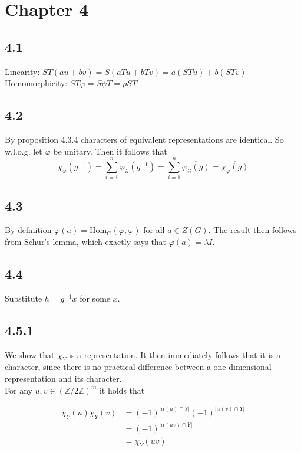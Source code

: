 \documentclass[12pt]{article}
\begin{document}
\section*{Chapter 4}

\subsection*{4.1}

Linearity: $ST(au + bv) = S(aTu + bTv) = a(STu) + b(STv)$ \\
Homomorphicity: $ST\varphi = S\psi T = \rho ST$

\subsection*{4.2}

By proposition 4.3.4 characters of equivalent representations are identical.
So w.l.o.g. let $\varphi$ be unitary. Then it follows that
$$
\chi_\varphi (g^{-1})
= \sum_{i=1}^{n} \varphi_{ii} (g^{-1})
= \sum_{i=1}^{n} \overline{\varphi_{ii} (g)}
= \overline{\chi_\varphi (g)}
$$

\subsection*{4.3}

By definition $\varphi(a) = \mathrm{Hom}_G(\varphi, \varphi)$ for all $a \in Z(G)$. The result then follows from Schur's lemma, which exactly says that $\varphi(a) = \lambda I$.

\subsection*{4.4}

Substitute $h = g^{-1}x$ for some $x$.

\subsection*{4.5.1}

We show that $\chi_Y$ is a representation. It then immediately follows that it is a character, since there is no practical difference between a one-dimensional representation and its character. \\
For any $u, v \in (\mathbb{Z}/2\mathbb{Z})^m$ it holds that

\begin{equation*}
    \begin{split}
        \chi_Y(u)\chi_Y(v) &= (-1)^{|\alpha(u) \cap Y|} (-1)^{|\alpha(v) \cap Y|} \\
        &= (-1)^{|\alpha(uv) \cap Y|} \\
        &= \chi_Y(uv)
    \end{split}
\end{equation*}
\end{document}
